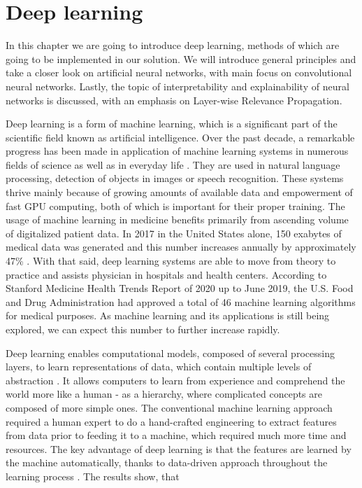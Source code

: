 
\chapter{Deep learning}
In this chapter we are going to introduce deep learning, methods of which are going to be implemented in our solution. We will introduce general principles and take a closer look on artificial neural networks, with main focus on convolutional neural networks. Lastly, the topic of interpretability and explainability of neural networks is discussed, with an emphasis on Layer-wise Relevance Propagation.

Deep learning is a form of machine learning, which is a significant part of the scientific field known as artificial intelligence. Over the past decade, a remarkable progress has been made in application of machine learning systems in numerous fields of science as well as in everyday life \cite{longsurvey2018}. They are used in natural language processing, detection of objects in images or speech recognition. These systems thrive mainly because of growing amounts of available data and empowerment of fast GPU computing, both of which is important for their proper training. The usage of machine learning in medicine benefits primarily from ascending volume of digitalized patient data. In 2017 in the United States alone, 150 exabytes of medical data was generated and this number increases annually by approximately 47\% \cite{stanford2017}. With that said, deep learning systems are able to move from theory to practice and assists physician in hospitals and health centers. According to Stanford Medicine Health Trends Report of 2020 \cite{stanford2020} up to June 2019, the U.S. Food and Drug Administration had approved a total of 46 machine learning algorithms for medical purposes. As machine learning and its applications is still being explored, we can expect this number to further increase rapidly.

Deep learning enables computational models, composed of several processing layers, to learn representations of data, which contain multiple levels of abstraction \cite{greekDeepLearning}. It allows computers to learn from experience and comprehend the world more like a human - as a hierarchy, where complicated concepts are composed of more simple ones. \cite{deeplearningbook} The conventional machine learning approach required a human expert to do a hand-crafted engineering to extract features from data prior to feeding it to a machine, which required much more time and resources. The key advantage of deep learning is that the features are learned by the machine automatically, thanks to data-driven approach throughout the learning process \cite{deeplearningHealthcare}. The results show, that  

